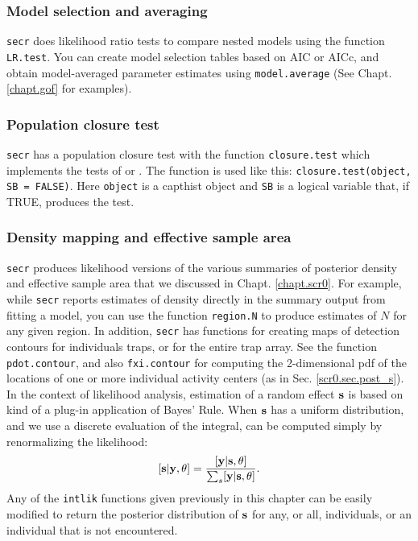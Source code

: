 \subsubsection{Model selection and averaging}
\mbox{\tt secr} does likelihood ratio tests to compare nested models
using the function \mbox{\tt LR.test}.  You can create model selection
tables based on AIC or AICc, and obtain model-averaged parameter
estimates using \mbox{\tt model.average} (See Chapt. \ref{chapt.gof}
for examples).


\subsubsection{Population closure test}
\mbox{\tt secr} has a population closure test with the function
\mbox{\tt closure.test} which implements the tests of
\citet{stanley_burnham:1999} or \citet{otis_etal:1978}. The function
is used like this:
\mbox{\tt closure.test(object, SB = FALSE)}.
Here \mbox{\tt object} is a 
capthist object and \mbox{\tt SB} is a logical variable that, if TRUE,
produces the 
\citet{stanley_burnham:1999} test. 


\subsubsection{Density mapping and effective sample area}
\mbox{\tt secr} produces likelihood versions of the various summaries
of posterior density and effective sample area that we discussed in
Chapt. \ref{chapt.scr0}. For example, while
\mbox{\tt secr} reports estimates of density directly in the summary
output from fitting a model, you can use 
the function \mbox{\tt region.N} to produce estimates of $N$ for any
given region.  In addition,
\mbox{\tt secr} 
has functions  for creating maps of detection contours for individuals
traps, or for the entire trap array. See the 
function \mbox{\tt pdot.contour}, and also
 \mbox{\tt fxi.contour} for computing the 2-dimensional pdf of 
 the locations of one or more individual activity centers (as in
 Sec. \ref{scr0.sec.post_s}). In the context of likelihood analysis, estimation of a
 random effect ${\bf s}$ is based on kind of a plug-in application of
 Bayes' Rule.
When ${\bf s}$ has a uniform distribution, and we use a
discrete evaluation of the integral, can be computed
simply by renormalizing the likelihood:
\[
 [{\bf s}| {\bf y},\theta] = \frac{ [{\bf y} | {\bf s},\theta]  }{ \sum_{s} [{\bf y} | {\bf s},\theta]  }.
\]
Any of the \mbox{\tt intlik} functions given previously in this
chapter can be easily modified to return the posterior distribution of
${\bf s}$ for 
any, or all, individuals, or an individual that is not encountered. 

